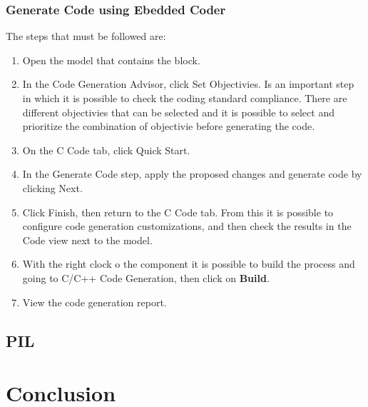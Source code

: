 \documentclass[12pt,a4paper]{report}
\begin{document}
\subsection{Generate Code using Ebedded Coder}
The steps that must be followed are:
\begin{enumerate}
	\item Open the model that contains the block. 
	\item In the Code Generation Advisor, click Set Objectivies. Is an important step in which it is possible to check the coding standard compliance. There are different objectivies that can be selected and it is possible to select and prioritize the combination of objectivie before generating the code.
	\item On the C Code tab, click Quick Start.
	\item In the Generate Code step, apply the proposed changes and generate code by clicking Next.
	\item Click Finish, then return to the C Code tab. From this it is possible to configure code generation customizations, and then check the results in the Code view next to the model.
	\item With the right clock o the component it is possible to build the process and going to C/C++ Code Generation, then click on \textbf{Build}.
	\item View the code generation report.
\end{enumerate}
\section{PIL}


\chapter{Conclusion}
	
	
\end{document}
